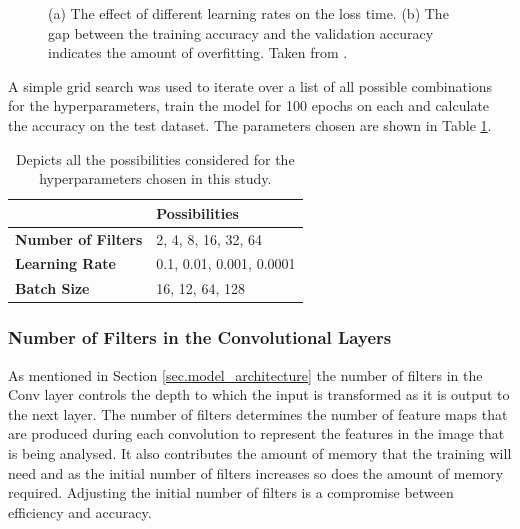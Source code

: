 \begin{figure}[htpb]
\begin{subfigure}{0.45\textwidth}
\caption{}
\label{fig.accuracies}
\end{subfigure}
\caption[Examples of accuracy and loss rate during training]{(a) The effect of different learning rates on the loss time.  (b) The gap between the training accuracy and the validation accuracy indicates the amount of overfitting. Taken from \citet{Karpathy3}.}
\label{fig.best_case}
\end{figure}
A simple grid search was used to iterate over a list of all possible combinations for the hyperparameters, train the model for 100 epochs on each and calculate the accuracy on the test dataset. The parameters chosen are shown in Table \ref{tab.grid_search}. 
\begin{table}[htbp]
\centering 
\begin{tabular}{l|l}
                           & \textbf{Possibilities}   \\ \hline
\textbf{Number of Filters} & 2, 4, 8, 16, 32, 64      \\ 
\textbf{Learning Rate}     & 0.1, 0.01, 0.001, 0.0001 \\ 
\textbf{Batch Size}        & 16, 12, 64, 128     \\ 
\end{tabular}
\caption[Hyperparameter possibilities]{Depicts all the possibilities considered for the hyperparameters chosen in this study.}
\label{tab.grid_search}
\end{table}
\subsubsection{Number of Filters in the Convolutional Layers}
As mentioned in Section \ref{sec.model_architecture} the number of filters in the Conv layer controls the depth to which the input is transformed as it is output to the next layer. The number of filters determines the number of feature maps that are produced during each convolution to represent the features in the image that is being analysed. It also contributes the amount of memory that the training will need and as the initial number of filters increases so does the amount of memory required. Adjusting the initial number of filters is a compromise between efficiency and accuracy. 

